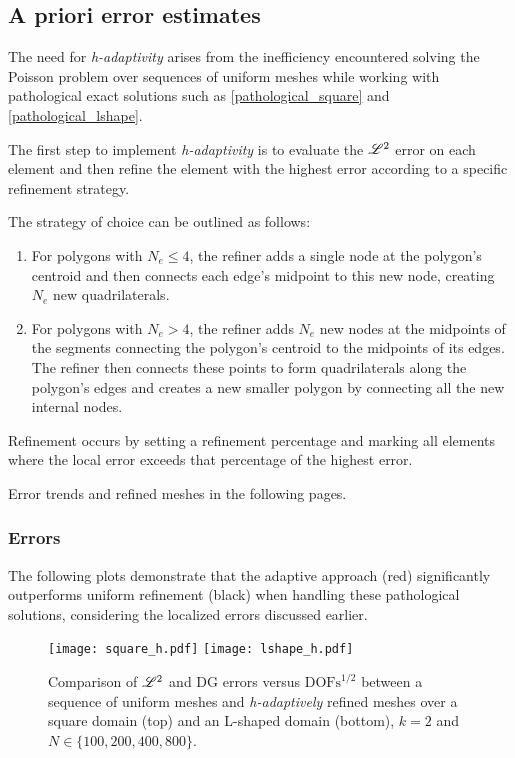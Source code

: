 \subsection{A priori error estimates}

The need for \textit{h-adaptivity} arises from the inefficiency encountered solving the Poisson problem over sequences of uniform meshes while working with pathological exact solutions such as \eqref{pathological_square} and \eqref{pathological_lshape}.

The first step to implement \textit{h-adaptivity} is to evaluate the $\mathscr{L}^2$ error on each element and then refine the element with the highest error according to a specific refinement strategy.

The strategy of choice can be outlined as follows:

\begin{enumerate}
    \item For polygons with $N_e \leq 4$, the refiner adds a single node at the polygon's centroid and then connects each edge's midpoint to this new node, creating $N_e$ new quadrilaterals.
    \item For polygons with $N_e > 4$, the refiner adds $N_e$ new nodes at the midpoints of the segments connecting the polygon's centroid to the midpoints of its edges. The refiner then connects these points to form quadrilaterals along the polygon's edges and creates a new smaller polygon by connecting all the new internal nodes.
\end{enumerate}

Refinement occurs by setting a refinement percentage and marking all elements where the local error exceeds that percentage of the highest error.

Error trends and refined meshes in the following pages.

\newpage
\subsubsection{Errors}

The following plots demonstrate that the adaptive approach (red) significantly outperforms uniform refinement (black) when handling these pathological solutions, considering the localized errors discussed earlier.

\begin{figure}[!ht]
	\centering
	\texttt{[image: square\_h.pdf]}
    \texttt{[image: lshape\_h.pdf]}
	\caption{Comparison of $\mathscr{L}^2$ and DG errors versus $\text{DOFs}^{1/2}$ between a sequence of uniform meshes and \textit{h-adaptively} refined meshes over a square domain (top) and an L-shaped domain (bottom), $k = 2$ and $N \in \{100, 200, 400, 800\}$.}
\end{figure}

